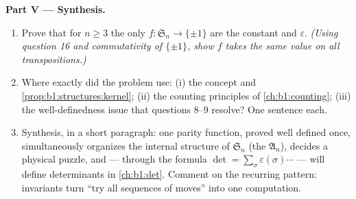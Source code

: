 \begin{problem}
\medskip
\noindent\textbf{Part V --- Synthesis.}
\begin{enumerate}[resume]
  \item Prove that for $n \geq 3$ the only   $f
        \colon \mathfrak S_n \to \{\pm 1\}$ are the constant
         and $\varepsilon$. \emph{(Using question 16 and
        commutativity of $\{\pm1\}$, show $f$ takes the same
        value on all transpositions.)}
  \item Where exactly did the problem use: (i) the 
        concept and \cref{prop:b1:structures:kernel}; (ii) the
        counting principles of \cref{ch:b1:counting}; (iii) the
        well-definedness issue that questions 8--9 resolve? One
        sentence each.
  \item Synthesis, in a short paragraph: one parity function,
        proved well defined once, simultaneously organizes the
        internal structure of $\mathfrak S_n$ (the 
        $\mathfrak A_n$), decides a physical puzzle, and ---
        through the formula $\det = \sum_\sigma
        \varepsilon(\sigma)\cdots$ --- will define determinants
        in \cref{ch:b1:det}. Comment on the recurring pattern:
        invariants turn ``try all sequences of moves'' into one
        computation.
\end{enumerate}
\end{problem}
